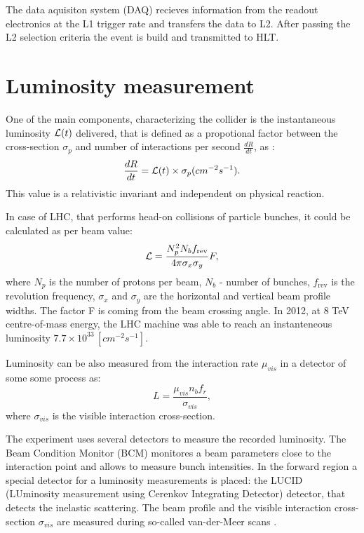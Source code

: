 The data aquisiton system (DAQ) recieves information from the readout electronics at the L1 trigger rate and  transfers the data to L2. After passing the L2 selection criteria the event is build and transmitted to HLT.

\section{Luminosity measurement}

One of the main components, characterizing the collider is the instantaneous luminosity $\mathcal{L}(t)$ delivered, that is defined as a propotional factor between the cross-section $\sigma_p$ and number of interactions per second $\frac{dR}{dt}$, as :
\begin{equation}
\frac{dR}{dt}= \mathcal{L}(t) \times \sigma_p (cm^{-2}s^{-1}).
\end{equation}
This value is a relativistic invariant and independent on physical reaction.

In case of LHC, that performs  head-on collisions of particle bunches, it could be calculated as per beam value:
\begin{equation}
\mathcal{L} = \frac{N_p^2 N_b f_{\textrm{rev}}}{4\pi  \sigma_x \sigma_y}F , 
\end{equation}
where $N_{p}$ is the number of protons per beam, $N_b$ - number of bunches, $f_{\textrm{rev}}$ is the revolution frequency, $\sigma_x$ and $\sigma_y$ are the horizontal and vertical beam profile widths. The factor F is coming from the beam crossing angle. In 2012, at 8 TeV centre-of-mass energy, the LHC machine was able to reach an instanteneous luminosity $7.7\times10^{33}\, [cm^{-2}s^{-1}]$. 

Luminosity can be also measured from the interaction rate $\mu_{vis}$ in a detector of some some process as:
\begin{equation}
L = \frac{\mu_{vis}n_b f_r}{\sigma_{vis}},
\end{equation}
where $\sigma_{vis}$ is the visible interaction cross-section.

The \atlas experiment uses several detectors to measure the recorded luminosity. The Beam Condition Monitor (BCM) monitores a beam parameters close to the interaction point and allows to measure bunch intensities. In the forward region a special detector for a luminosity measurements is placed: the LUCID (LUminosity measurement using Cerenkov Integrating Detector) detector, that detects the inelastic scattering. The beam profile and the visible interaction cross-section $\sigma_{vis}$ are measured during so-called van-der-Meer scans \cite{vanderMeer}. 